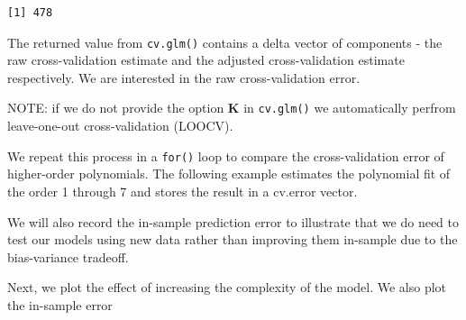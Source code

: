 \documentclass[]{article}
\newenvironment{Shaded}{\begin{snugshade}}{\end{snugshade}}
\newcommand{\CommentTok}[1]{\textcolor[rgb]{0.56,0.35,0.01}{\textit{#1}}}
\newcommand{\ControlFlowTok}[1]{\textcolor[rgb]{0.13,0.29,0.53}{\textbf{#1}}}
\newcommand{\DataTypeTok}[1]{\textcolor[rgb]{0.13,0.29,0.53}{#1}}
\newcommand{\DecValTok}[1]{\textcolor[rgb]{0.00,0.00,0.81}{#1}}
\newcommand{\KeywordTok}[1]{\textcolor[rgb]{0.13,0.29,0.53}{\textbf{#1}}}
\newcommand{\NormalTok}[1]{#1}
\newcommand{\OperatorTok}[1]{\textcolor[rgb]{0.81,0.36,0.00}{\textbf{#1}}}
\newcommand{\OtherTok}[1]{\textcolor[rgb]{0.56,0.35,0.01}{#1}}
\newcommand{\StringTok}[1]{\textcolor[rgb]{0.31,0.60,0.02}{#1}}
\begin{document}
\begin{verbatim}
[1] 478
\end{verbatim}

The returned value from \texttt{cv.glm()} contains a delta vector of components - the raw cross-validation estimate and the adjusted cross-validation estimate respectively. We are interested in the raw cross-validation error.

NOTE: if we do not provide the option \textbf{K} in \texttt{cv.glm()} we automatically perfrom leave-one-out cross-validation (LOOCV).

We repeat this process in a \texttt{for()} loop to compare the cross-validation error of higher-order polynomials. The following example estimates the polynomial fit of the order 1 through 7 and stores the result in a cv.error vector.

We will also record the in-sample prediction error to illustrate that we do need to test our models using new data rather than improving them in-sample due to the bias-variance tradeoff.

\begin{Shaded}
\end{Shaded}

Next, we plot the effect of increasing the complexity of the model. We also plot the in-sample error
\end{document}
